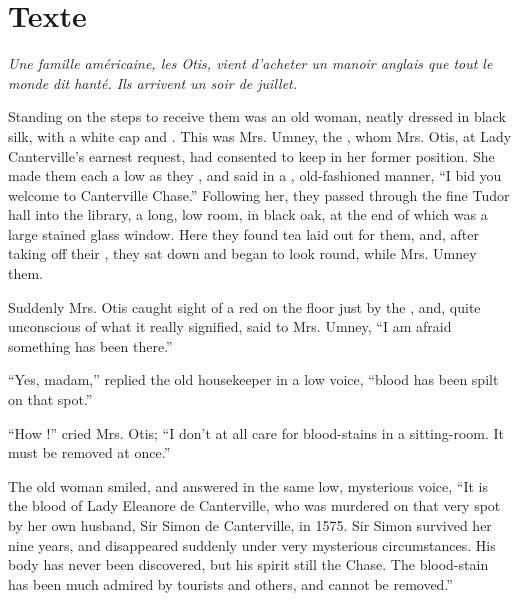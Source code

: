 \documentclass[troisieme]{fiche}
\begin{document}
\section{Texte}

\noindent\small\textit{Une famille américaine, les Otis, vient d'acheter un manoir anglais
que tout le monde dit hanté. Ils arrivent un soir de juillet.}\normalsize

\begin{texte}
Standing on the steps to receive them was an old woman, neatly dressed in black silk, with a
white cap and . This was Mrs. Umney, the
, whom Mrs. Otis, at Lady Canterville's
earnest request, had consented to keep in her former position. She made them each a low
 as they , and said in a , old-fashioned manner, ``I
bid you welcome to Canterville Chase.'' Following her, they passed through the fine Tudor
hall into the library, a long, low room,  in black oak, at
the end of which was a large stained glass window. Here they found tea laid out for them,
and, after taking off their , they sat down and began
to look round, while Mrs. Umney  them.

Suddenly Mrs. Otis caught sight of a  red 
on the floor just by the , and, quite unconscious of
what it really signified, said to Mrs. Umney, ``I am afraid
something has been  there.''

``Yes, madam,'' replied the old housekeeper in a low voice, ``blood has been spilt on that
spot.''

``How !'' cried Mrs. Otis; ``I don't at all care for blood-stains
in a sitting-room. It must be removed at once.''

The old woman smiled, and answered in the same low, mysterious voice, ``It is the blood of
Lady Eleanore de Canterville, who was murdered on that very spot by her own husband, Sir
Simon de Canterville, in 1575. Sir Simon survived her nine years,
and disappeared suddenly under very mysterious circumstances. His body has never been
discovered, but his  spirit still 
the Chase. The blood-stain has been much admired by tourists and others, and cannot be
removed.''


\end{texte}
\end{document}
